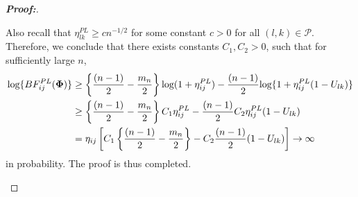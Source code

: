 \documentclass[times,sort&compress,3p]{elsarticle}
\theoremstyle{plain}%
\theoremstyle{definition}
\def\log{\hbox{log}}
\def\log{\hbox{log}}
\def\be{\begin{eqnarray}}
\def\ee{\end{eqnarray}}
\def\bolddelta{{\mbox{\boldmath $\delta$}}}
\def\boldmu{{\mbox{\boldmath $\mu$}}}
\newcommand{\umu}               {\mbox{\boldmath$\mu$}}
\newcommand{\uPhi}              {\mbox{\boldmath$\Phi$}}
\newcommand{\rsz}[1]{\textcolor{red}{#1}}
\begin{document}
\begin{proof}[\textbf{\upshape Proof:}]
\begin{description}
{Also recall that $\eta_{lk}^{PL} \geq cn^{-1/2}$ for some constant $c > 0$ for all $(l,k)\in\mathcal{P}$. Therefore, we conclude that there exists constants $C_1, C_2 > 0$, such that for sufficiently large $n$,
\begin{align*}
    \log\{BF^{PL}_{ij}(\uPhi) \} & \geq \left\{\frac{(n - 1)}{2} - \frac{m_n}{2}\right\}\log(1 + \eta^{PL}_{ij}) - \frac{(n - 1)}{2}\log\{1 + \eta_{ij}^{PL}(1 - U_{lk})\}\\
    &\geq \left\{\frac{(n - 1)}{2} - \frac{m_n}{2}\right\}C_1\eta_{ij}^{PL} - \frac{(n - 1)}{2}C_2\eta_{ij}^{PL}(1 - U_{lk})\\
    & = \eta_{ij}\left[C_1\left\{\frac{(n - 1)}{2} - \frac{m_n}{2}\right\} - C_2\frac{(n - 1)}{2}(1 - U_{lk})\right]\to \infty
\end{align*}
in probability. The proof is thus completed. 
}







\end{description}
\end{proof}
\end{document}
